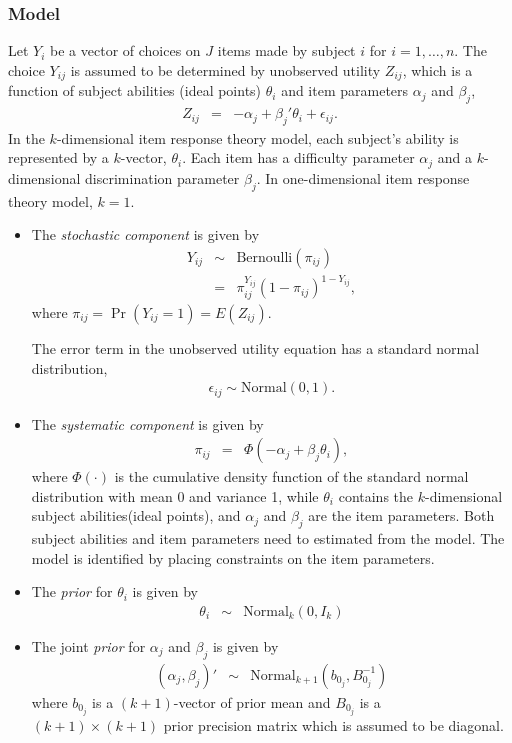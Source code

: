 \subsubsection{Model} 

Let $Y_i$ be a vector of choices on $J$ items made by subject $i$ for 
$i = 1, \ldots, n$. The choice $Y_{ij}$ is assumed to be 
determined by unobserved utility $Z_{ij}$, which is a function
of subject abilities (ideal points) $\theta_i$ and item parameters
$\alpha_j$ and $\beta_j$,
\begin{eqnarray*}
Z_{ij} &=& -\alpha_j + \beta_j' \theta_i + \epsilon_{ij}.
\end{eqnarray*}
In the $k$-dimensional item response theory model, each subject's ability is 
represented by a $k$-vector, $\theta_i$. Each item has a difficulty 
parameter $\alpha_j$ and a $k$-dimensional discrimination parameter
$\beta_j$. In one-dimensional item response theory model, $k = 1$.

\begin{itemize}
\item The \emph{stochastic component} is given by
\begin{eqnarray*}
Y_{ij}  &  \sim & \textrm{Bernoulli}(\pi_{ij})\\
&  = & \pi_{ij}^{Y_{ij}}(1-\pi_{ij})^{1-Y_{ij}},
\end{eqnarray*}
where $\pi_{ij}=\Pr(Y_{ij}=1)=E(Z_{ij})$.

The error term in the unobserved utility equation has
a standard normal distribution,
\begin{eqnarray*}
\epsilon_{ij} \sim \textrm{Normal}(0, 1).
\end{eqnarray*}

\item The \emph{systematic component} is given by
\begin{eqnarray*}
\pi_{ij} &=& \Phi(-\alpha_j + \beta_j \theta_i),
\end{eqnarray*}
where $\Phi(\cdot)$ is the cumulative density function of the standard
normal distribution with mean 0 and variance 1, while $\theta_i$
contains the $k$-dimensional subject abilities(ideal points), and
$\alpha_{j}$ and $\beta_j$ are the item parameters. Both subject
abilities and item parameters need to estimated from the model. The
model is identified by placing constraints on the item parameters.

\item The \emph{prior} for $\theta_i$ is given by
\begin{eqnarray*}
\theta_i &\sim& \textrm{Normal}_k(0, I_k)
\end{eqnarray*}

\item The joint \emph{prior} for $\alpha_j$ and $\beta_j$ is given by
\begin{eqnarray*}
(\alpha_j, \beta_j)' &\sim& \textrm{Normal}_{k+1} \left( b_{0_j}, B_{0_j}^{-1}\right)
\end{eqnarray*}
where $b_{0_j}$ is a $(k+1)$-vector of prior mean and $B_{0_j}$ is a $(k+1) 
\times (k+1)$ prior precision matrix which is assumed to be diagonal.

\end{itemize}
 
